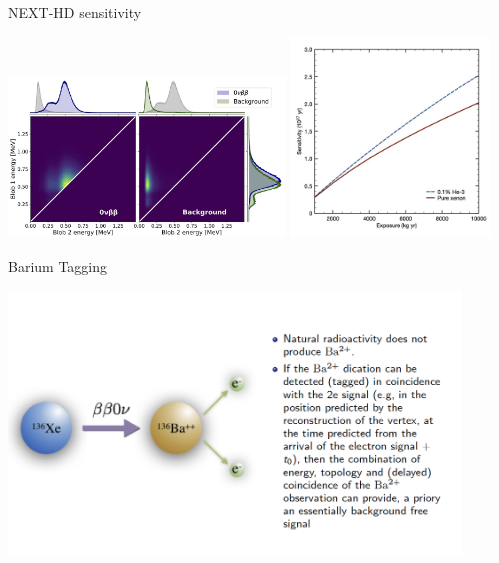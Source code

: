 \documentclass [aspectratio=169]{beamer}
\newcommand{\BI}{\ensuremath{{}^{214}{\rm Bi}}}
\newcommand{\so}{\ensuremath{\rm S_1}}
\begin{document}
%
%
%
%


\begin{frame}{NEXT-HD sensitivity}

\includegraphics[width=0.55\textwidth]{BlobComparison.jpg}
\includegraphics[width=0.40\textwidth]{sensitivity_nexthd_lsc.jpg}
\end{frame}

\begin{frame}{Barium Tagging}

\includegraphics[width=0.90\textwidth]{Ba2pCartoon.png}

\end{frame}
\end{document}
